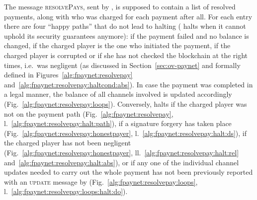   The message \textsc{resolvePays}, sent by \simulator{}, is supposed to contain
  a list of resolved payments, along with who was charged for each payment after
  all. For each entry there are four ``happy paths'' that do not lead to
  \fpaynet{} halting (\fpaynet{} halts when it cannot uphold its security
  guarantees anymore): if the payment failed and no balance is changed, if the
  charged player is the one who initiated the payment, if the charged player is
  corrupted or if she has not checked the blockchain at the right times, i.e.\
  was negligent (as discussed in Section~\ref{sec:ov-paynet} and formally
  defined in Figures~\ref{alg:fpaynet:resolvepay}
  and~\ref{alg:fpaynet:resolvepay:haltcond:abs}). In case the payment was
  completed in a legal manner, the balance of all channels involved is updated
  accordingly (Fig.~\ref{alg:fpaynet:resolvepay:loops}). Conversely, \fpaynet{}
  halts if the charged player was not on the payment path
  (Fig.~\ref{alg:fpaynet:resolvepay},
  l.~\ref{alg:fpaynet:resolvepay:halt:path}), if a signature forgery has taken
  place (Fig.~\ref{alg:fpaynet:resolvepay:honestpayer},
  l.~\ref{alg:fpaynet:resolvepay:halt:ds}), if the charged player has not been
  negligent (Fig.~\ref{alg:fpaynet:resolvepay:honestpayer},
  ll.~\ref{alg:fpaynet:resolvepay:halt:rel}
  and~\ref{alg:fpaynet:resolvepay:halt:abs}), or if any one of the individual
  channel updates needed to carry out the whole payment has not been previously
  reported with an \textsc{update} message by \simulator{}
  (Fig.~\ref{alg:fpaynet:resolvepay:loops},
  l.~\ref{alg:fpaynet:resolvepay:loops:halt:do}).

